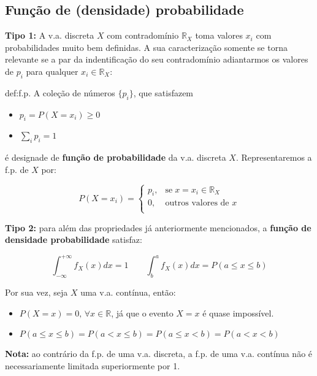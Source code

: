 \subsection[2.1 Função de (densidade) probabilidade]{\hspace*{0.075 em}\raisebox{0.2 em}{$\pmb{\drsh}$} Função de (densidade) probabilidade}

\noindent\textbf{Tipo 1:} A v.a. discreta $X$ com contradomínio $\mathbb{R}_X$ toma valores $x_i$ com probabilidades muito bem definidas. A sua caracterização somente se torna relevante se a par da indentificação do seu contradomínio adiantarmos os valores de $p_i$ para qualquer $x_i \in \mathbb{R}_X$:

\begin{theo}{def:f.p.}\label{def:f.p.}
    A coleção de números $\{p_i\}$, que satisfazem

    \begin{itemize}
        \item $p_i = P(X = x_i) \ge 0$
        \item $\sum_i p_i = 1$
    \end{itemize}
    
    \noindent é designade de \textbf{função de probabilidade} da v.a. discreta $X$. Representaremos a f.p. de $X$ por:

    $$ 
    P(X = x_i)= \left\{
        \begin{array}{ll}
              p_i, & \text{se}\; x = x_i \in \mathbb{R}_X\\
               0, & \text{outros valores de }x\\
        \end{array} 
    \right. 
    $$
    
\end{theo}

\newpage
\noindent\textbf{Tipo 2:} para além das propriedades já anteriormente mencionados, a \textbf{função de densidade probabilidade} satisfaz:
{

\begin{mdframed}
$$
    \int_{-\infty}^{+\infty}f_X(x)dx = 1\qquad
    \int_{b}^{a}f_X(x)dx = P(a \leq x \leq b)
$$

\noindent Por sua vez, seja $X$ uma v.a. contínua, então:

\begin{itemize}
    \item $P(X = x) = 0,\, \forall x \in \mathbb{R}$, já que o evento ${X = x}$ é quase impossível.
    \item $P(a \leq x \leq b) = P(a < x \leq b) = P(a \leq x < b) = P(a < x < b)$
\end{itemize}

\noindent\textbf{Nota:} ao contrário da f.p. de uma v.a. discreta, a f.p. de uma v.a. contínua não é necessariamente limitada superiormente por 1.
\end{mdframed}
}
